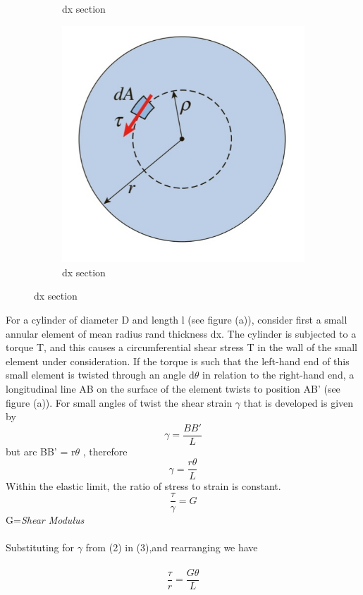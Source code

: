 \documentclass[12pt,a4paper]{article}	%
\begin{document}
\begin{figure}[h!]
\begin{subfigure}[b]{0.4\linewidth}
		\caption{dx section}
	\end{subfigure}
	\begin{subfigure}[b]{0.4\linewidth}
	\includegraphics[width=\linewidth]{Ok2.png}
	\caption{dx section}
\end{subfigure}
\end{figure}
For a cylinder of diameter D and length l (see figure (a)), consider first a small annular element of mean radius rand thickness dx. The cylinder is subjected to a torque T, and this causes a circumferential shear stress T in the wall of the small element under consideration. If the torque is such that the left-hand end of this small element is twisted through an angle d$\theta$ in relation to the right-hand end, a longitudinal line AB on the surface of the element twists to position AB' (see figure (a)). For small angles of twist the shear strain $\gamma$ that is developed is given by
\begin{equation}
\gamma = \frac{BB'}{L}
\end{equation}
but arc BB' = r$\theta$ , therefore
\begin{equation}
\gamma = \frac{r\theta}{L}
\end{equation}
Within the elastic limit, the ratio of stress to strain is constant.
\thispagestyle{empty}	%
\begin{equation}
\frac{\tau}{\gamma}=G
\end{equation}
G=\textit{Shear Modulus}\\
\\
Substituting for $\gamma$ from (2) in (3),and rearranging we have \\ \\
\begin{equation}
\frac{\tau}{r}=\frac{G\theta}{L}
\end{equation}
\\
\\
\end{document}
